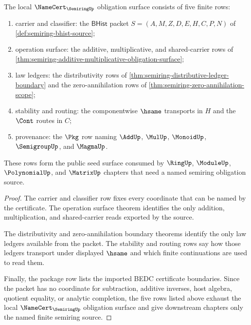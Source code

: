 \begin{theorem}
\label{thm:semiring-namecert-obligation-surface}
The local $\NameCert_{\SemiringUp}$ obligation surface consists of five finite
rows:
\begin{enumerate}
\item carrier and classifier: the $\mathsf{BHist}$ packet
$S=(A,M,Z,D,E,H,C,P,N)$ of \autoref{def:semiring-bhist-source};
\item operation surface: the additive, multiplicative, and shared-carrier rows
of \autoref{thm:semiring-additive-multiplicative-obligation-surface};
\item law ledgers: the distributivity rows of
\autoref{thm:semiring-distributive-ledger-boundary} and the
zero-annihilation rows of \autoref{thm:semiring-zero-annihilation-scope};
\item stability and routing: the componentwise $\hsame$ transports in $H$ and
the $\Cont$ routes in $C$;
\item provenance: the $\Pkg$ row naming $\AddUp$, $\MulUp$, $\MonoidUp$,
$\SemigroupUp$, and $\MagmaUp$.
\end{enumerate}
These rows form the public seed surface consumed by $\RingUp$, $\ModuleUp$,
$\PolynomialUp$, and $\MatrixUp$ chapters that need a named semiring
obligation source.
\end{theorem}
\begin{proof}
The carrier and classifier row fixes every coordinate that can be named by the
certificate. The operation surface theorem identifies the only addition,
multiplication, and shared-carrier reads exported by the source.

The distributivity and zero-annihilation boundary theorems identify the only
law ledgers available from the packet. The stability and routing rows say how
those ledgers transport under displayed $\hsame$ and which finite
continuations are used to read them.

Finally, the package row lists the imported BEDC certificate boundaries. Since
the packet has no coordinate for subtraction, additive inverses, host algebra,
quotient equality, or analytic completion, the five rows listed above exhaust
the local $\NameCert_{\SemiringUp}$ obligation surface and give downstream
chapters only the named finite semiring source.
\end{proof}

